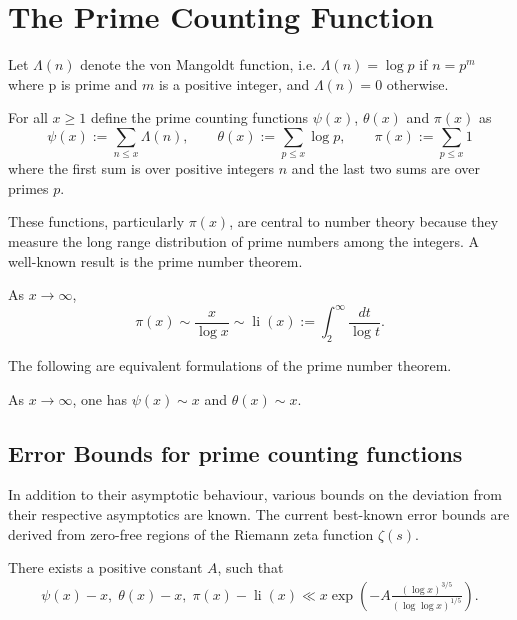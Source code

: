 \chapter{The Prime Counting Function}
\label{chap:prime_counting_function}

\unintegrated

Let $\Lambda(n)$ denote the von Mangoldt function, i.e. $\Lambda(n) = \log p$ if $n = p^m$ where p is prime and $m$ is a positive integer, and $\Lambda(n) = 0$ otherwise. 

\begin{definition}
For all $x \ge 1$ define the prime counting functions $\psi(x)$, $\theta(x)$ and $\pi(x)$ as
\[
\psi(x) := \sum_{n \le x}\Lambda(n),\qquad \theta(x) := \sum_{p \le x}\log p,\qquad \pi(x) := \sum_{p \le x}1
\]
where the first sum is over positive integers $n$ and the last two sums are over primes $p$.
\end{definition}

These functions, particularly $\pi(x)$, are central to number theory because they measure the long range distribution of prime numbers among the integers. A well-known result is the prime number theorem.

\begin{theorem}
As $x \to \infty$, 
\[
\pi(x) \sim \frac{x}{\log x} \sim \operatorname{li}(x) := \int_2^{\infty}\frac{dt}{\log t}.
\]
\end{theorem}

The following are equivalent formulations of the prime number theorem.

\begin{theorem}
As $x \to \infty$, one has $\psi(x) \sim x$ and $\theta(x) \sim x$.
\end{theorem}

\section{Error Bounds for prime counting functions}
In addition to their asymptotic behaviour, various bounds on the deviation from their respective asymptotics are known. The current best-known error bounds are derived from zero-free regions of the Riemann zeta function $\zeta(s)$. 

\begin{theorem}
There exists a positive constant $A$, such that
\begin{align*}
\psi(x) - x, \; \theta(x) - x, \; \pi(x) - \operatorname{li}(x) \ll x\exp\left(-A\frac{(\log x)^{3/5}}{(\log\log x)^{1/5}}\right).
\end{align*}
\end{theorem}

